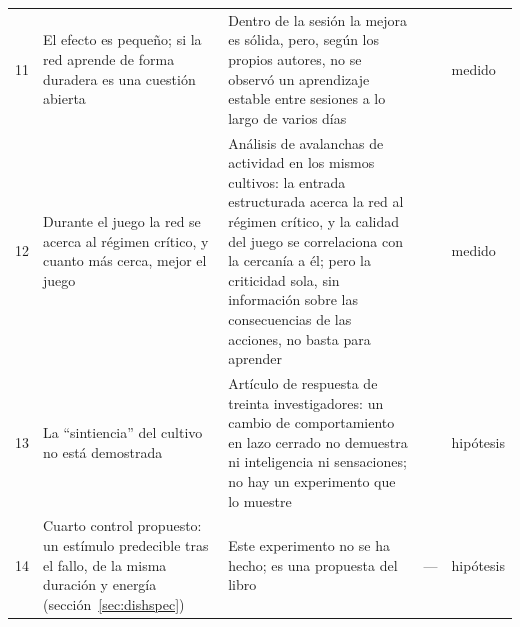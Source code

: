 {\begin{longtable}{>{\raggedright}p{0.5cm}>{\raggedright}p{4.0cm}>{\raggedright}p{5.6cm}>{\raggedright}p{2.3cm}>{\raggedright\arraybackslash}p{1.7cm}}
11 & El efecto es pequeño; si la red aprende de forma duradera es una cuestión abierta & Dentro de la sesión la mejora es sólida, pero, según los propios autores, no se observó un aprendizaje estable entre sesiones a lo largo de varios días & \cite{Kagan2022} & medido \\
12 & Durante el juego la red se acerca al régimen crítico, y cuanto más cerca, mejor el juego & Análisis de avalanchas de actividad en los mismos cultivos: la entrada estructurada acerca la red al régimen crítico, y la calidad del juego se correlaciona con la cercanía a él; pero la criticidad sola, sin información sobre las consecuencias de las acciones, no basta para aprender & \cite{Habibollahi2023} & medido \\
13 & La “sintiencia” del cultivo no está demostrada & Artículo de respuesta de treinta investigadores: un cambio de comportamiento en lazo cerrado no demuestra ni inteligencia ni sensaciones; no hay un experimento que lo muestre & \cite{Balci2023} & hipótesis \\
14 & Cuarto control propuesto: un estímulo predecible tras el fallo, de la misma duración y energía (sección~\ref{sec:dishspec}) & Este experimento no se ha hecho; es una propuesta del libro & --- & hipótesis \\
\bottomrule
\end{longtable}}
